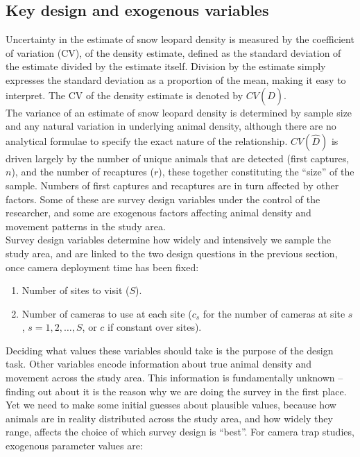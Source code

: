 \documentclass[a4paper,11pt]{article} %
\begin{document}
\subsection{Key design and exogenous variables} \label{s:vars}
Uncertainty in the estimate of snow leopard density is measured by the coefficient of variation (CV), of the density estimate, defined as the standard deviation of the estimate divided by the estimate itself. Division by the estimate simply expresses the standard deviation as a proportion of the mean, making it easy to interpret. The CV of the density estimate is denoted by $CV(\hat{D})$.
\\[1em]
The variance of an estimate of snow leopard density is determined by sample size and any natural variation in underlying animal density, although there are no analytical formulae to specify the exact nature of the relationship. $CV(\hat{D})$ is driven largely by the number of unique animals that are detected (first captures, $n$), and the number of recaptures ($r$), these together constituting the ``size'' of the sample. Numbers of first captures and recaptures are in turn affected by other factors. Some of these are survey design variables under the control of the researcher, and some are exogenous factors affecting animal density and movement patterns in the study area. 
\\[1em]
Survey design variables determine how widely and intensively we sample the study area, and are linked to the two design questions in the previous section, once camera deployment time has been fixed:
\begin{enumerate}
\item Number of sites to visit ($S$).
\item Number of cameras to use at each site ($c_s$ for the number of cameras at site $s$, $s=1,2,\dots,S$, or $c$ if constant over sites).   
\end{enumerate}
Deciding what values these variables should take is the purpose of the design task. Other variables encode information about true animal density and movement across the study area. This information is fundamentally unknown -- finding out about it is the reason why we are doing the survey in the first place. Yet we need to make some initial guesses about plausible values, because how animals are in reality distributed across the study area, and how widely they range, affects the choice of which survey design is ``best''. For camera trap studies, exogenous parameter values are:
\end{document}
